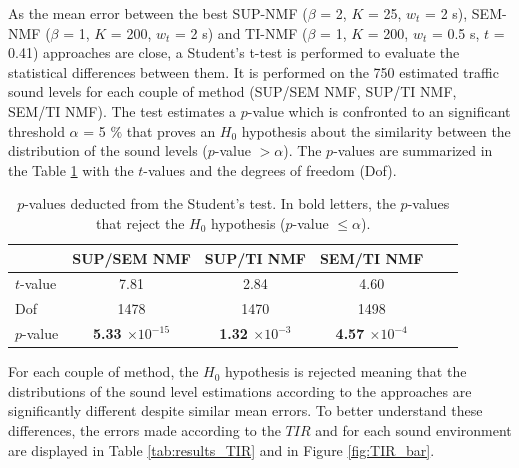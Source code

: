 \documentclass[twocolumn]{svjour3}          %
\begin{document}
As the mean error between the best SUP-NMF ($\beta$ = 2, $K$ = 25, $w_t$ = 2 s), SEM-NMF ($\beta$ = 1, $K$ = 200, $w_t$ = 2 s) and TI-NMF ($\beta$ = 1, $K$ = 200, $w_t$ = 0.5 s, $t$ = 0.41) approaches are close, a Student's t-test is performed to evaluate the statistical differences between them. It is performed on the 750 estimated traffic sound levels for each couple of method (SUP/SEM NMF, SUP/TI NMF, SEM/TI NMF). The test estimates a $p$-value which is confronted to an significant threshold $\alpha$ = 5 $\%$ that proves an $H_0$ hypothesis about the similarity between the distribution of the sound levels ($p$-value $> \alpha$). The $p$-values are summarized in the Table \ref{tab:student_test} with the $t$-values and the degrees of freedom (Dof).

\begin{table}[t]
\centering
\begin{tabular}{lccccc}
\toprule
  & SUP/SEM NMF & SUP/TI NMF & SEM/TI NMF \\
\midrule
$t$-value & 7.81 & 2.84 & 4.60\\
Dof & 1478 & 1470 & 1498\\
$p$-value & \textbf{5.33 $\times 10^{-15}$} & \textbf{1.32 $\times 10^{-3}$} & \textbf{4.57 $\times 10^{-4}$} \\
\bottomrule
\end{tabular}
\caption{$p$-values deducted from the Student's test. In bold letters, the $p$-values that reject the $H_0$ hypothesis ($p$-value $\leq \alpha$).}
\label{tab:student_test}
\end{table}

For each couple of method, the $H_0$ hypothesis is rejected meaning that the distributions of the sound level estimations according to the approaches are significantly different despite similar mean errors.
To better understand these differences, the errors made according to the $TIR$ and for each sound environment are displayed in Table \ref{tab:results_TIR} and in Figure \ref{fig:TIR_bar}.
\end{document}

